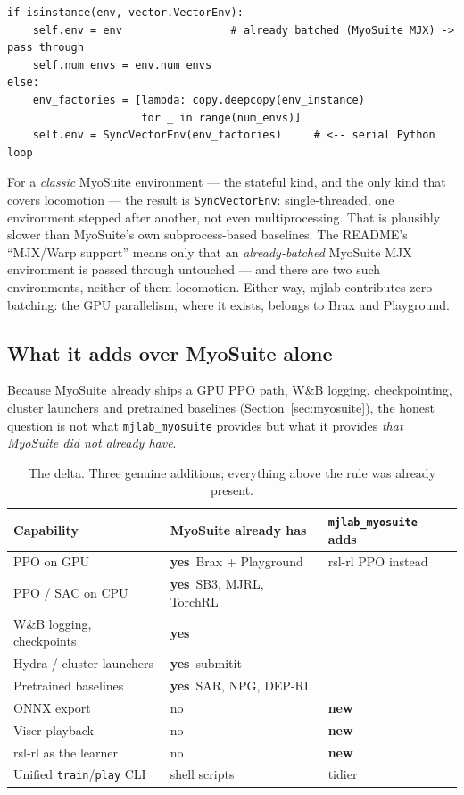 \documentclass[11pt,a4paper]{article}
\newcommand{\yes}{\textbf{yes}}
\newcommand{\no}{no}
\newcommand{\na}{\textemdash}
\begin{document}
\begin{lstlisting}
if isinstance(env, vector.VectorEnv):
    self.env = env                 # already batched (MyoSuite MJX) -> pass through
    self.num_envs = env.num_envs
else:
    env_factories = [lambda: copy.deepcopy(env_instance)
                     for _ in range(num_envs)]
    self.env = SyncVectorEnv(env_factories)     # <-- serial Python loop
\end{lstlisting}

\noindent
For a \emph{classic} MyoSuite environment --- the stateful kind, and the only kind that
covers locomotion --- the result is \texttt{SyncVectorEnv}: single-threaded, one environment
stepped after another, not even multiprocessing. That is plausibly slower than MyoSuite's own
subprocess-based baselines. The README's ``MJX/Warp support'' means only that an
\emph{already-batched} MyoSuite MJX environment is passed through untouched --- and there are
two such environments, neither of them locomotion. Either way, mjlab contributes zero
batching: the GPU parallelism, where it exists, belongs to Brax and Playground.

\subsection{What it adds over MyoSuite alone}

Because MyoSuite already ships a GPU PPO path, W\&B logging, checkpointing, cluster
launchers and pretrained baselines (Section~\ref{sec:myosuite}), the honest question is not
what \texttt{mjlab\_myosuite} provides but what it provides \emph{that MyoSuite did not
already have}.

\begin{table}[h!]
\centering
\small
\begin{tabular}{@{}L{5.0cm}L{3.6cm}L{3.8cm}@{}}
\toprule
Capability & MyoSuite already has & \texttt{mjlab\_myosuite} adds \\
\midrule
PPO on GPU              & \yes\ Brax + Playground & rsl-rl PPO instead \\
PPO / SAC on CPU        & \yes\ SB3, MJRL, TorchRL & \na \\
W\&B logging, checkpoints & \yes & \na \\
Hydra / cluster launchers & \yes\ submitit & \na \\
Pretrained baselines    & \yes\ SAR, NPG, DEP-RL & \na \\
\midrule
ONNX export             & \no & \textbf{new} \\
Viser playback          & \no & \textbf{new} \\
rsl-rl as the learner   & \no & \textbf{new} \\
Unified \texttt{train}/\texttt{play} CLI & shell scripts & tidier \\
\bottomrule
\end{tabular}
\caption{The delta. Three genuine additions; everything above the rule was already present.}
\end{table}
\end{document}
